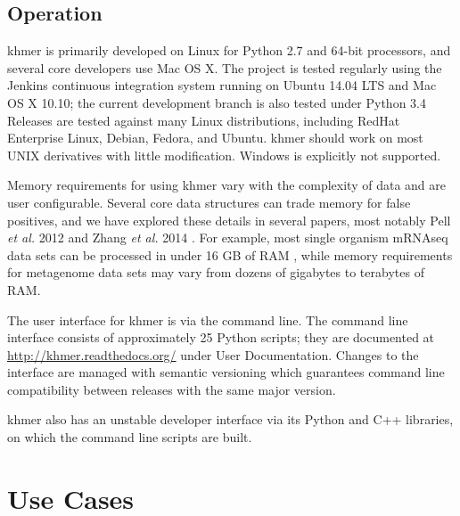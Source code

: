 \documentclass[10pt,a4paper]{article}
\begin{document}
\subsection*{Operation}

khmer is primarily developed on Linux for Python 2.7 and 64-bit processors, and several core developers use Mac OS X.  The project is tested regularly using the Jenkins continuous integration system running on Ubuntu 14.04 LTS and Mac OS X 10.10; the current development branch is also tested under Python 3.4  Releases are tested against many Linux distributions, including RedHat Enterprise Linux, Debian, Fedora, and Ubuntu.  khmer should work on most UNIX derivatives with little modification.  Windows is explicitly not supported.

Memory requirements for using khmer vary with the complexity of data and are user configurable.  Several core data structures can trade memory for false positives, and we have explored these details in several papers, most notably Pell \textit{et al.} 2012 \cite{Pell2012} and Zhang \textit{et al.} 2014 \cite{zhang2014}.  For example, most single organism mRNAseq data sets can be processed in under 16 GB of RAM \cite{diginorm} \cite{Lowe2015}, while memory requirements for metagenome data sets may vary from dozens of gigabytes to terabytes of RAM.

The user interface for khmer is via the command line.  The command line interface consists of approximately 25 Python scripts; they are documented at \url{http://khmer.readthedocs.org/} under User Documentation.  Changes to the interface are managed with semantic versioning \cite{semver} which guarantees command line compatibility between releases with the same major version.

khmer also has an unstable developer interface via its Python and C++ libraries, on which the command line scripts are built.


\section*{Use Cases} %
\end{document}
